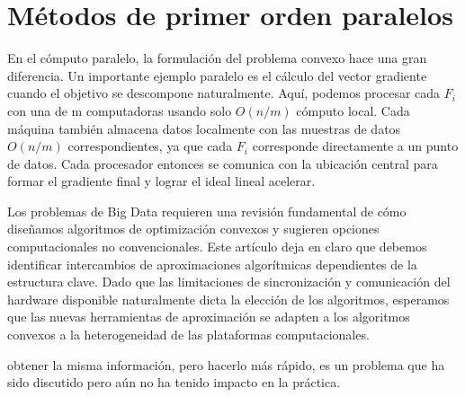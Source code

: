 \documentclass[]{article}
\begin{document}
\section{Métodos de primer orden
paralelos}\label{metodos-de-primer-orden-paralelos}

En el cómputo paralelo, la formulación del problema convexo hace una
gran diferencia. Un importante ejemplo paralelo es el cálculo del vector
gradiente cuando el objetivo se descompone naturalmente. Aquí, podemos
procesar cada \(F_i\) con una de m computadoras usando solo
\(O (n / m)\) cómputo local. Cada máquina también almacena datos
localmente con las muestras de datos \(O (n / m)\) correspondientes, ya
que cada \(F_i\) corresponde directamente a un punto de datos. Cada
procesador entonces se comunica con la ubicación central para formar el
gradiente final y lograr el ideal lineal acelerar.

Los problemas de Big Data requieren una revisión fundamental de cómo
diseñamos algoritmos de optimización convexos y sugieren opciones
computacionales no convencionales. Este artículo deja en claro que
debemos identificar intercambios de aproximaciones algorítmicas
dependientes de la estructura clave. Dado que las limitaciones de
sincronización y comunicación del hardware disponible naturalmente dicta
la elección de los algoritmos, esperamos que las nuevas herramientas de
aproximación se adapten a los algoritmos convexos a la heterogeneidad de
las plataformas computacionales.

obtener la misma información, pero hacerlo más rápido, es un problema
que ha sido discutido pero aún no ha tenido impacto en la práctica.
\end{document}
